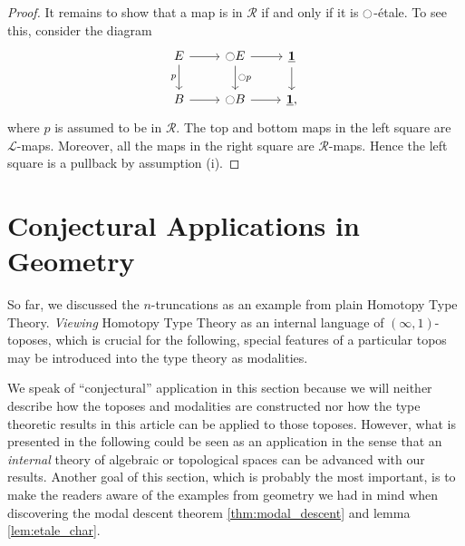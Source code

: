\documentclass[9pt,twosided]{amsart}
\begin{document}
\begin{proof}
  It remains to show that a map is in $\mathcal{R}$ if and only if it is ${\ocircle}$-\'etale. To see this, consider the diagram
  \begin{equation*}
    \begin{tikzcd}
      E \arrow[d,swap,"p"] \arrow[r] & \modal E \arrow[d,"\modal p"] \arrow[r] & \unit \arrow[d] \\
      B \arrow[r] & \modal B \arrow[r] & \unit,
    \end{tikzcd}
  \end{equation*}
  where $p$ is assumed to be in $\mathcal{R}$. The top and bottom maps in the left square are $\mathcal{L}$-maps. Moreover, all the maps in the right square are $\mathcal{R}$-maps. Hence the left square is a pullback by assumption (i).
\end{proof}

\section{Conjectural Applications in Geometry}

So far, we discussed the $n$-truncations as an example from plain Homotopy Type Theory.
\emph{Viewing} Homotopy Type Theory as an internal language of $(\infty,1)$-toposes,
which is crucial for the following,
special features of a particular topos may be introduced into the type theory as modalities.

We speak of ``conjectural'' application in this section because we will neither describe how the toposes and modalities are constructed nor how the type theoretic results in this article can be applied to those toposes.
However, what is presented in the following could be seen as an application in the sense that an \emph{internal} theory of algebraic or topological spaces can be advanced with our results.
Another goal of this section, which is probably the most important, is to make the readers aware of the examples from geometry we had in mind when discovering the modal descent theorem \ref{thm:modal_descent} and lemma \ref{lem:etale_char}.
\end{document}

